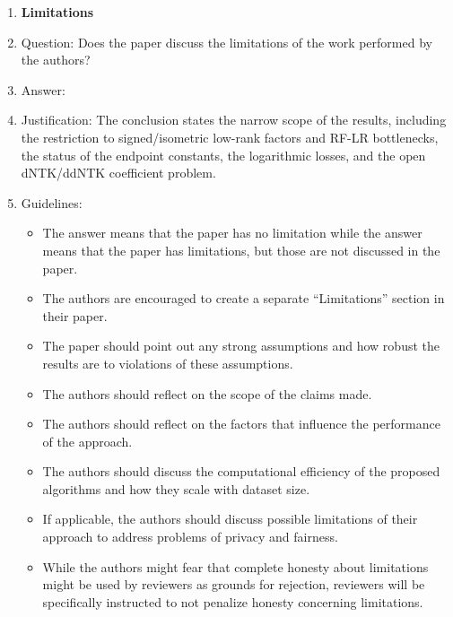 \documentclass{article}
\begin{document}
\begin{enumerate}[leftmargin=1.5em]
\item {\bf Limitations}
    \item[] Question: Does the paper discuss the limitations of the work performed by the authors?
    \item[] Answer: \answerYes{}
    \item[] Justification: The conclusion states the narrow scope of the results, including the restriction to signed/isometric low-rank factors and RF-LR bottlenecks, the status of the endpoint constants, the logarithmic losses, and the open dNTK/ddNTK coefficient problem.
    \item[] Guidelines:
    \begin{itemize}
        \item The answer \answerNA{} means that the paper has no limitation while the answer \answerNo{} means that the paper has limitations, but those are not discussed in the paper.
        \item The authors are encouraged to create a separate ``Limitations'' section in their paper.
        \item The paper should point out any strong assumptions and how robust the results are to violations of these assumptions.
        \item The authors should reflect on the scope of the claims made.
        \item The authors should reflect on the factors that influence the performance of the approach.
        \item The authors should discuss the computational efficiency of the proposed algorithms and how they scale with dataset size.
        \item If applicable, the authors should discuss possible limitations of their approach to address problems of privacy and fairness.
        \item While the authors might fear that complete honesty about limitations might be used by reviewers as grounds for rejection, reviewers will be specifically instructed to not penalize honesty concerning limitations.
    \end{itemize}


\end{enumerate}
\end{document}
